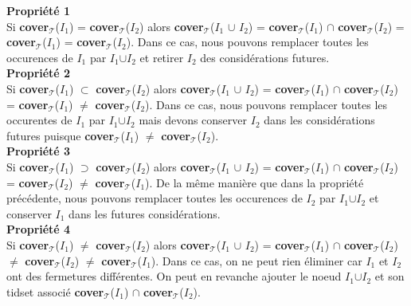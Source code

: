 \documentclass[a4paper,10pt]{report}
\begin{document}
\textbf{Propriété 1} \\
Si \textbf{cover$_{\mathcal{T}}$}(\emph{$I_{1}$}) = \textbf{cover$_{\mathcal{T}}$}(\emph{$I_{2}$}) alors \textbf{cover$_{\mathcal{T}}$}(\emph{$I_{1}$} $\cup$ \emph{$I_{2}$}) = \textbf{cover$_{\mathcal{T}}$}(\emph{$I_{1}$})  $\cap$ \textbf{cover$_{\mathcal{T}}$}(\emph{$I_{2}$}) = \textbf{cover$_{\mathcal{T}}$}(\emph{$I_{1}$}) = \textbf{cover$_{\mathcal{T}}$}(\emph{$I_{2}$}). Dans ce cas, nous pouvons remplacer toutes les occurences de \emph{$I_{1}$} par \emph{$I_{1}$}$\cup$\emph{$I_{2}$} et retirer \emph{$I_{2}$} des considérations futures.\\

\textbf{Propriété 2} \\
Si \textbf{cover$_{\mathcal{T}}$}(\emph{$I_{1}$}) $\subset$ \textbf{cover$_{\mathcal{T}}$}(\emph{$I_{2}$}) alors \textbf{cover$_{\mathcal{T}}$}(\emph{$I_{1}$}  $\cup$ \emph{$I_{2}$}) = \textbf{cover$_{\mathcal{T}}$}(\emph{$I_{1}$})  $\cap$ \textbf{cover$_{\mathcal{T}}$}(\emph{$I_{2}$}) = \textbf{cover$_{\mathcal{T}}$}(\emph{$I_{1}$}) $\neq$ \textbf{cover$_{\mathcal{T}}$}(\emph{$I_{2}$}). Dans ce cas, nous pouvons remplacer toutes les occurentes de \emph{$I_{1}$} par \emph{$I_{1}$}$\cup$\emph{$I_{2}$} mais devons conserver \emph{$I_{2}$} dans les considérations futures puisque \textbf{cover$_{\mathcal{T}}$}(\emph{$I_{1}$}) $\neq$ \textbf{cover$_{\mathcal{T}}$}(\emph{$I_{2}$}). \\

\textbf{Propriété 3} \\
Si \textbf{cover$_{\mathcal{T}}$}(\emph{$I_{1}$}) $\supset$ \textbf{cover$_{\mathcal{T}}$}(\emph{$I_{2}$}) alors \textbf{cover$_{\mathcal{T}}$}(\emph{$I_{1}$}  $\cup$ \emph{$I_{2}$}) = \textbf{cover$_{\mathcal{T}}$}(\emph{$I_{1}$})  $\cap$ \textbf{cover$_{\mathcal{T}}$}(\emph{$I_{2}$}) = \textbf{cover$_{\mathcal{T}}$}(\emph{$I_{2}$}) $\neq$ \textbf{cover$_{\mathcal{T}}$}(\emph{$I_{1}$}). De la même manière que dans la propriété précédente, nous pouvons remplacer toutes les occurences de \emph{$I_{2}$} par \emph{$I_{1}$}$\cup$\emph{$I_{2}$} et conserver \emph{$I_{1}$} dans les futures considérations. \\

\textbf{Propriété 4} \\
Si \textbf{cover$_{\mathcal{T}}$}(\emph{$I_{1}$}) $\neq$ \textbf{cover$_{\mathcal{T}}$}(\emph{$I_{2}$}) alors \textbf{cover$_{\mathcal{T}}$}(\emph{$I_{1}$}  $\cup$ \emph{$I_{2}$}) = \textbf{cover$_{\mathcal{T}}$}(\emph{$I_{1}$})  $\cap$ \textbf{cover$_{\mathcal{T}}$}(\emph{$I_{2}$}) $\neq$ \textbf{cover$_{\mathcal{T}}$}(\emph{$I_{2}$}) $\neq$ \textbf{cover$_{\mathcal{T}}$}(\emph{$I_{1}$}). Dans ce cas, on ne peut rien éliminer car \emph{$I_{1}$} et \emph{$I_{2}$} ont des fermetures différentes. On peut en revanche ajouter le noeud \emph{$I_{1}$}$\cup$\emph{$I_{2}$} et son tidset associé \textbf{cover$_{\mathcal{T}}$}(\emph{$I_{1}$})  $\cap$ \textbf{cover$_{\mathcal{T}}$}(\emph{$I_{2}$}).
\end{document}

